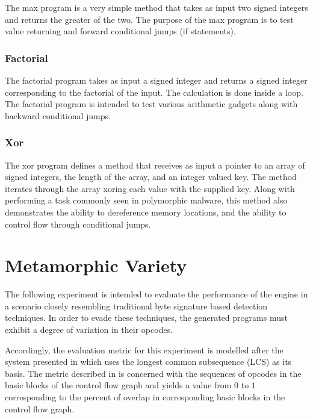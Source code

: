             The max program is a very simple method that takes as input two
            signed integers and returns the greater of the two. The purpose
            of the max program is to test value returning and forward
            conditional jumps (if statements).

        \subsubsection{Factorial}

            The factorial program takes as input a signed integer and
            returns a signed integer corresponding to the factorial of the
            input. The calculation is done inside a loop. The factorial
            program is intended to test various arithmetic gadgets along
            with backward conditional jumps.

        \subsubsection{Xor}

            The xor program defines a method that receives as input a
            pointer to an array of signed integers, the length of the array,
            and an integer valued key. The method iterates through the array
            xoring each value with the supplied key. Along with performing a
            task commonly seen in polymorphic malware, this method also
            demonstrates the ability to dereference memory locations, and
            the ability to control flow through conditional jumps.
        
\section{Metamorphic Variety}
    
    The following experiment is intended to evaluate the performance of the
    engine in a scenario closely resembling traditional byte signature based
    detection techniques. In order to evade these techniques, the generated
    programs must exhibit a degree of variation in their opcodes.

    Accordingly, the evaluation metric for this experiment is modelled after
    the system presented in \cite{cfg_lcs} which uses the longest common
    subsequence (LCS) as its basis. The metric described in \cite{cfg_lcs}
    is concerned with the sequences of opcodes in the basic blocks of the
    control flow graph and yields a value from $0$ to $1$ corresponding to
    the percent of overlap in corresponding basic blocks in the control flow
    graph.
    
